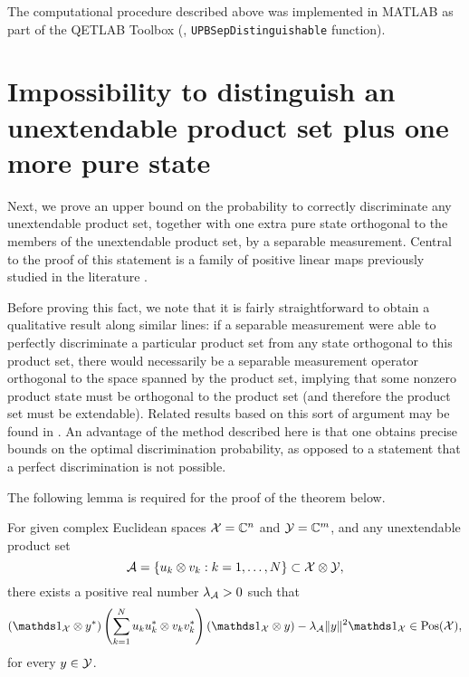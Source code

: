 The computational procedure described above was implemented in MATLAB as part 
of the QETLAB Toolbox (\cite{Johnston2015}, \texttt{UPBSepDistinguishable} function).


\section[Impossibility to distinguish an unextendable product set plus one more 
pure state]{Impossibility to distinguish an unextendable\newline
product set plus one more pure state}

Next, we prove an upper bound on the probability to correctly discriminate
any unextendable product set, together with one extra pure state orthogonal
to the members of the unextendable product set, by a separable measurement.
Central to the proof of this statement is a family of positive linear maps
previously studied in the literature \cite{Terhal01,Bandyopadhyay05}.

Before proving this fact, we note that it is fairly straightforward to obtain
a qualitative result along similar lines:
if a separable measurement were able to perfectly discriminate a particular
product set from any state orthogonal to this product set, there would
necessarily be a separable measurement operator orthogonal to the space spanned
by the product set, implying that some nonzero product state must be orthogonal
to the product set (and therefore the product set must be extendable).
Related results based on this sort of argument may be found in \cite{Bandyopadhyay11}.
An advantage of the method described here is that one obtains
precise bounds on the optimal discrimination probability, as opposed to a
statement that a perfect discrimination is not possible.

The following lemma is required for the proof of the theorem below.

\begin{lemma}[Terhal]
  \label{lemma:lambda}
  For given complex Euclidean spaces $\mathcal{X}=\mathbb{C}^n$ and $\mathcal{Y}=\mathbb{C}^m$, and
  any unextendable product set
  \begin{equation}
    \mathcal{A} = \{ u_{k}\otimes v_{k} : k = 1, \ldots, N \} \subset \mathcal{X}\otimes\mathcal{Y},
  \end{equation}
  there exists a positive real number $\lambda_{\mathcal{A}} > 0$ such that
  \begin{equation}
    \left(\I_{\X} \otimes y^{\ast}\right)
    \left( \sum_{k = 1}^{N}u_{k}u_{k}^{\ast}\otimes v_{k}v_{k}^{\ast} \right)
    \left(\I_{\X} \otimes y\right)
    - \lambda_{\A}\norm{y}^{2}\I_{\X} \in \Pos(\X),
  \end{equation}
  for every $y \in \mathcal{Y}$.
\end{lemma}

